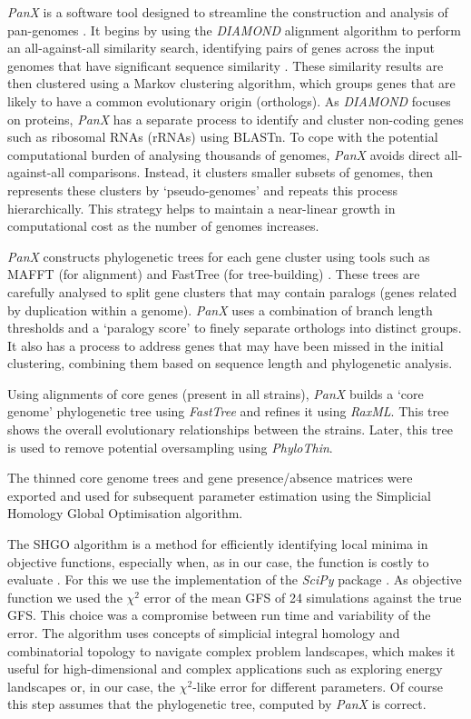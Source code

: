 \textit{PanX} is a software tool designed to streamline the construction and analysis of pan-genomes \cite{Ding_2017}.
It begins by using the \textit{DIAMOND} alignment algorithm to perform an all-against-all similarity search, identifying pairs of genes across the input genomes that have significant sequence similarity \cite{Buchfink_2014}.
These similarity results are then clustered using a Markov clustering algorithm, which groups genes that are likely to have a common evolutionary origin (orthologs).
As \textit{DIAMOND} focuses on proteins, \textit{PanX} has a separate process to identify and cluster non-coding genes such as ribosomal RNAs (rRNAs) using BLASTn.
To cope with the potential computational burden of analysing thousands of genomes, \textit{PanX} avoids direct all-against-all comparisons.
Instead, it clusters smaller subsets of genomes, then represents these clusters by `pseudo-genomes' and repeats this process hierarchically.
This strategy helps to maintain a near-linear growth in computational cost as the number of genomes increases.

\textit{PanX} constructs phylogenetic trees for each gene cluster using tools such as MAFFT (for alignment) and FastTree (for tree-building) \cite{Katoh_2002} \cite{Price_2010}.
These trees are carefully analysed to split gene clusters that may contain paralogs (genes related by duplication within a genome).
\textit{PanX} uses a combination of branch length thresholds and a `paralogy score' to finely separate orthologs into distinct groups.
It also has a process to address genes that may have been missed in the initial clustering, combining them based on sequence length and phylogenetic analysis.

Using alignments of core genes (present in all strains), \textit{PanX} builds a `core genome' phylogenetic tree using \textit{FastTree} and refines it using \textit{RaxML}.
This tree shows the overall evolutionary relationships between the strains.
Later, this tree is used to remove potential oversampling using \textit{PhyloThin}.

The thinned core genome trees and gene presence/absence matrices were exported and used for subsequent parameter estimation using the Simplicial Homology Global Optimisation algorithm.

The \ac{SHGO} algorithm is a method for efficiently identifying local minima in objective functions, especially when, as in our case, the function is costly to evaluate \cite{Endres_2018}.
For this we use the implementation of the \textit{SciPy} package \cite{scipy}.
As objective function we used the $\chi^2$ error of the mean \ac{GFS} of 24 simulations against the true \ac{GFS}.
This choice was a compromise between run time and variability of the error.
The algorithm uses concepts of simplicial integral homology and combinatorial topology to navigate complex problem landscapes,
which makes it useful for high-dimensional and complex applications such as exploring energy landscapes or, in our case, the $\chi^2$-like error for different parameters.
Of course this step assumes that the phylogenetic tree, computed by \textit{PanX} is correct.

